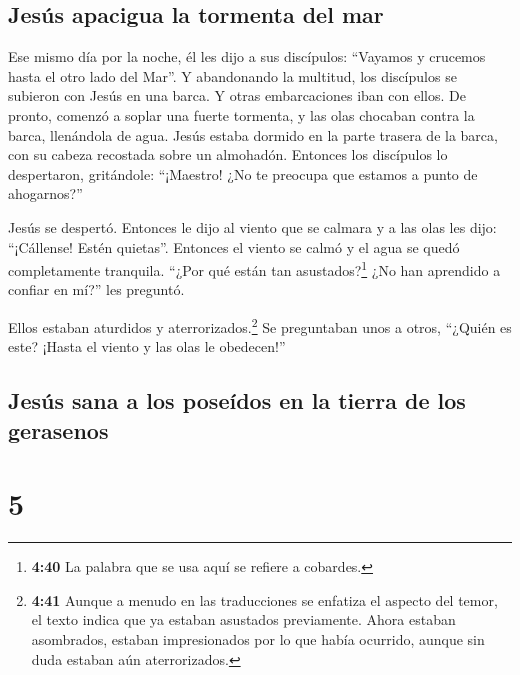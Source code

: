 \hypertarget{jesuxfas-apacigua-la-tormenta-del-mar}{%
\subsection{Jesús apacigua la tormenta del
mar}\label{jesuxfas-apacigua-la-tormenta-del-mar}}

 Ese mismo día por la noche, él les dijo a sus
discípulos: ``Vayamos y crucemos hasta el otro lado del Mar''.
 Y abandonando la multitud, los discípulos se subieron
con Jesús en una barca. Y otras embarcaciones iban con ellos.
 De pronto, comenzó a soplar una fuerte tormenta, y las
olas chocaban contra la barca, llenándola de agua.  Jesús
estaba dormido en la parte trasera de la barca, con su cabeza recostada
sobre un almohadón. Entonces los discípulos lo despertaron, gritándole:
``¡Maestro! ¿No te preocupa que estamos a punto de ahogarnos?''

 Jesús se despertó. Entonces le dijo al viento que se
calmara y a las olas les dijo: ``¡Cállense! Estén quietas''. Entonces el
viento se calmó y el agua se quedó completamente tranquila.
 ``¿Por qué están tan asustados?\footnote{\textbf{4:40}
  La palabra que se usa aquí se refiere a cobardes.} ¿No han aprendido a
confiar en mí?'' les preguntó.

 Ellos estaban aturdidos y aterrorizados.\footnote{\textbf{4:41}
  Aunque a menudo en las traducciones se enfatiza el aspecto del temor,
  el texto indica que ya estaban asustados previamente. Ahora estaban
  asombrados, estaban impresionados por lo que había ocurrido, aunque
  sin duda estaban aún aterrorizados.} Se preguntaban unos a otros,
``¿Quién es este? ¡Hasta el viento y las olas le obedecen!''

\hypertarget{jesuxfas-sana-a-los-poseuxeddos-en-la-tierra-de-los-gerasenos}{%
\subsection{Jesús sana a los poseídos en la tierra de los
gerasenos}\label{jesuxfas-sana-a-los-poseuxeddos-en-la-tierra-de-los-gerasenos}}

\hypertarget{section-4}{%
\section{5}\label{section-4}}

